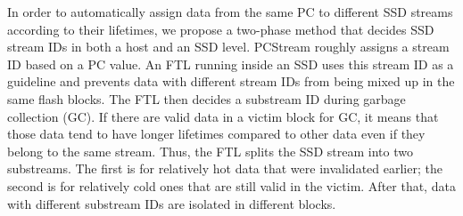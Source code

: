In order to automatically assign data from the same PC to different SSD streams
according to their lifetimes, we propose a two-phase method that decides SSD
stream IDs in both a host and an SSD level.  {\sf PCStream} roughly assigns a
stream ID based on a PC value.  An FTL running inside an SSD uses this stream
ID as a guideline and prevents data with different stream IDs from being mixed
up in the same flash blocks. The FTL then decides a substream ID during garbage
collection (GC). If there are valid data in a victim block for GC, it means
that those data tend to have longer lifetimes compared to other data even if
they belong to the same stream. Thus, the FTL splits the SSD stream into two
substreams.  The first is for relatively hot data that were invalidated
earlier; the second is for relatively cold ones that are still valid in the
victim.  After that, data with different substream IDs are isolated in
different blocks. 

